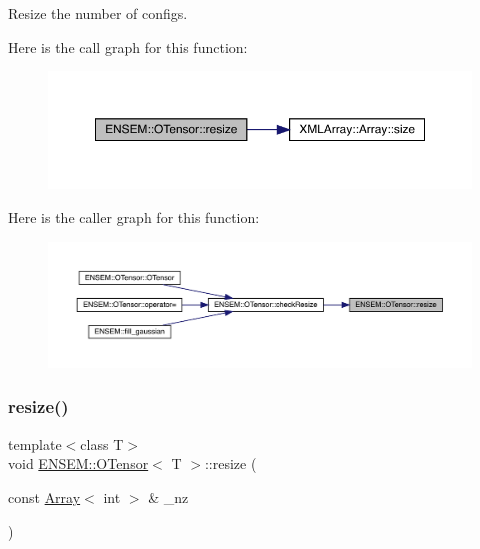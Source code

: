 Resize the number of configs. 

Here is the call graph for this function\+:
\nopagebreak
\begin{figure}[H]
\begin{center}
\leavevmode
\includegraphics[width=350pt]{da/d8a/classENSEM_1_1OTensor_abe0bd734d08b1140d7794ec760a89435_cgraph}
\end{center}
\end{figure}
Here is the caller graph for this function\+:
\nopagebreak
\begin{figure}[H]
\begin{center}
\leavevmode
\includegraphics[width=350pt]{da/d8a/classENSEM_1_1OTensor_abe0bd734d08b1140d7794ec760a89435_icgraph}
\end{center}
\end{figure}
\mbox{\label{classENSEM_1_1OTensor_abe0bd734d08b1140d7794ec760a89435}} 
\subsubsection{\texorpdfstring{resize()}{resize()}\hspace{0.1cm}{\footnotesize\ttfamily [2/6]}}
{\footnotesize\ttfamily template$<$class T$>$ \\
void \mbox{\hyperlink{classENSEM_1_1OTensor}{E\+N\+S\+E\+M\+::\+O\+Tensor}}$<$ T $>$\+::resize (\begin{DoxyParamCaption}\item[{const \mbox{\hyperlink{classXMLArray_1_1Array}{Array}}$<$ int $>$ \&}]{\+\_\+nz }\end{DoxyParamCaption})\hspace{0.3cm}{\ttfamily [inline]}}




